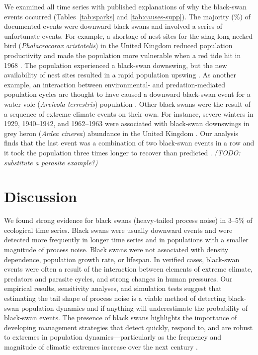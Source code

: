 We examined all time series with published explanations of why the black-swan events occurred (Tables~\ref{tab:sparks} and \ref{tab:causes-supp}). The majority (\percBSDown \%) of documented events were downward black swans and involved a series of unfortunate events. For example, a shortage of nest sites for the shag long-necked bird (\textit{Phalacrocorax aristotelis}) in the United Kingdom reduced population productivity and made the population more vulnerable when a red tide hit in 1968 \citep{potts1980}. The population experienced a black-swan downswing, but the new availability of nest sites resulted in a rapid population upswing \citep{potts1980}. As another example, an interaction between environmental- and predation-mediated population cycles are thought to have caused a downward black-swan event for a water vole (\textit{Arvicola terrestris}) population \citep{saucy1994}. Other black swans were the result of a sequence of extreme climate events on their own. For instance, severe winters in 1929, 1940--1942, and 1962--1963 were associated with black-swan downswings in grey heron (\textit{Ardea cinerea}) abundance in the United Kingdom \citep{stafford1971}. Our analysis finds that the last event was a combination of two black-swan events in a row and it took the population three times longer to recover than predicted \citep{stafford1971}. \textit{(TODO: substitute a parasite example?)}

\section{Discussion}

We found strong evidence for black swans (heavy-tailed process noise) in 3--5\% of ecological time series. Black swans were usually downward events and were detected more frequently in longer time series and in populations with a smaller magnitude of process noise. Black swans were not associated with density dependence, population growth rate, or lifespan. In verified cases, black-swan events were often a result of the interaction between elements of extreme climate, predators and parasite cycles, and strong changes in human pressures. Our empirical results, sensitivity analyses, and simulation tests suggest that estimating the tail shape of process noise is a viable method of detecting black-swan population dynamics and if anything will underestimate the probability of black-swan events. The presence of black swans highlights the importance of developing management strategies that detect quickly, respond to, and are robust to extremes in population dynamics---particularly as the frequency and magnitude of climatic extremes increase over the next century \citep{easterling2000,ipcc2012}.

